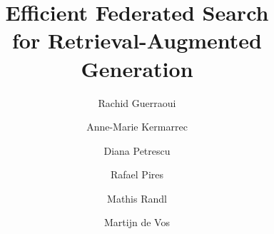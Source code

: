 \documentclass[sigplan]{acmart}
\theoremstyle{definition}
\theoremstyle{remark}
\begin{document}
\title[Efficient Federated Search for Retrieval-Augmented Generation]{Efficient Federated Search \\for Retrieval-Augmented Generation}

\author{Rachid Guerraoui}

\author{Anne-Marie Kermarrec}

\author{Diana Petrescu}

\author{Rafael Pires}

\author{Mathis Randl}

\author{Martijn de Vos}

\renewcommand{\shortauthors}{Guerraoui et al.}





\maketitle

















\end{document}
